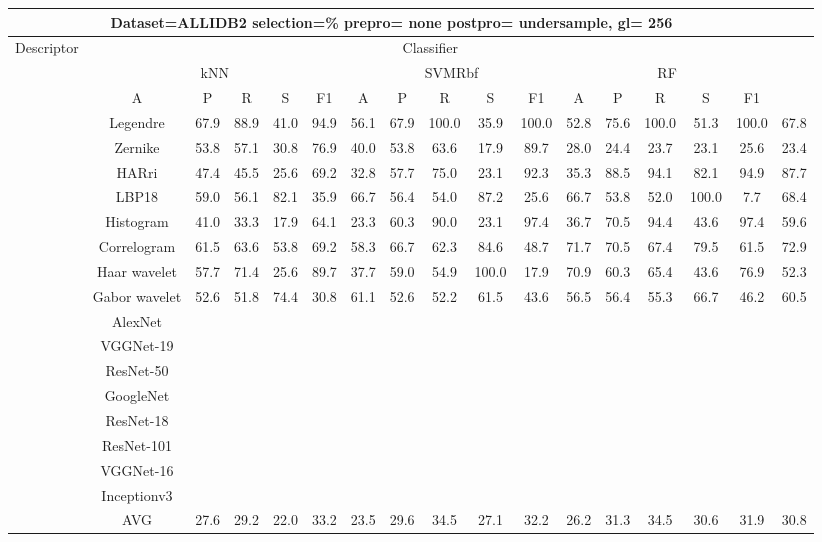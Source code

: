 \documentclass[12pt,italian]{article}
\begin{document}
\begin{tiny}
\begin{longtable}{lcccccccccccccccc}
\toprule
\multicolumn{16}{c}{Dataset=ALLIDB2 selection=\% prepro= none postpro= undersample, gl= 256} \\ 
\toprule
Descriptor & \multicolumn{15}{c}{Classifier} \\ 
& \multicolumn{5}{c}{kNN} & \multicolumn{5}{c}{SVMRbf} & \multicolumn{5}{c}{RF} \\ 
& A & P & R & S & F1 & A & P & R & S & F1 & A & P & R & S & F1 \\ 
\midrule
& Legendre & 67.9 & 88.9 & 41.0 & 94.9 & 56.1 & 67.9 & 100.0 & 35.9 & 100.0 & 52.8 & 75.6 & 100.0 & 51.3 & 100.0 & 67.8 \\ 
& Zernike & 53.8 & 57.1 & 30.8 & 76.9 & 40.0 & 53.8 & 63.6 & 17.9 & 89.7 & 28.0 & 24.4 & 23.7 & 23.1 & 25.6 & 23.4 \\ 
& HARri & 47.4 & 45.5 & 25.6 & 69.2 & 32.8 & 57.7 & 75.0 & 23.1 & 92.3 & 35.3 & 88.5 & 94.1 & 82.1 & 94.9 & 87.7 \\ 
& LBP18 & 59.0 & 56.1 & 82.1 & 35.9 & 66.7 & 56.4 & 54.0 & 87.2 & 25.6 & 66.7 & 53.8 & 52.0 & 100.0 &  7.7 & 68.4 \\ 
& Histogram & 41.0 & 33.3 & 17.9 & 64.1 & 23.3 & 60.3 & 90.0 & 23.1 & 97.4 & 36.7 & 70.5 & 94.4 & 43.6 & 97.4 & 59.6 \\ 
& Correlogram & 61.5 & 63.6 & 53.8 & 69.2 & 58.3 & 66.7 & 62.3 & 84.6 & 48.7 & 71.7 & 70.5 & 67.4 & 79.5 & 61.5 & 72.9 \\ 
& Haar wavelet & 57.7 & 71.4 & 25.6 & 89.7 & 37.7 & 59.0 & 54.9 & 100.0 & 17.9 & 70.9 & 60.3 & 65.4 & 43.6 & 76.9 & 52.3 \\ 
& Gabor wavelet & 52.6 & 51.8 & 74.4 & 30.8 & 61.1 & 52.6 & 52.2 & 61.5 & 43.6 & 56.5 & 56.4 & 55.3 & 66.7 & 46.2 & 60.5 \\ 
& AlexNet \\ 
& VGGNet-19 \\ 
& ResNet-50 \\ 
& GoogleNet \\ 
& ResNet-18 \\ 
& ResNet-101 \\ 
& VGGNet-16 \\ 
& Inceptionv3 \\ 
\hline
& AVG & 27.6 & 29.2 & 22.0 & 33.2 & 23.5 & 29.6 & 34.5 & 27.1 & 32.2 & 26.2 & 31.3 & 34.5 & 30.6 & 31.9 & 30.8 \\ 
\hline
\bottomrule
\end{longtable} 


\end{tiny}
\end{document}
